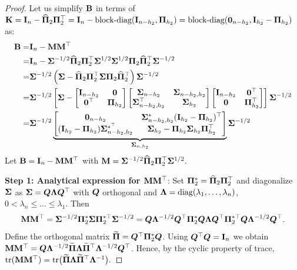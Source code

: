 \documentclass[numsec,webpdf,modern,medium,namedate]{oup-authoring-template}
\theoremstyle{thmstyleone}%
\theoremstyle{thmstyletwo}%
\theoremstyle{thmstylethree}%
\begin{document}
\begin{proof}
Let us simplify $\bB$ in terms of $\bK = \bI_n - \hatPi_2{\bPi}_2^\top = \bI_n - \text{block-diag}(\bI_{n-h_2},{\bPi}_{h_2}) = \text{block-diag}(\bzero_{n-h_2},\bI_{h_2}-{\bPi}_{h_2})$ as:
$$
\begin{aligned}
    \bB = & \bI_n - \bM\bM^\top\\
    = & \bI_n - {\bSig}^{-1/2} \hatPi_2{\bPi}_2^\top  {\bSig}^{1/2}{\bSig}^{1/2} {\bPi}_2\hatPi^\top_2{\bSig}^{-1/2}\\
    = & {\bSig}^{-1/2}\left({\bSig} - \hatPi_2 {\bPi}_2^\top {\bSig} {\bPi}_2\hatPi^\top_2\right){\bSig}^{-1/2}\\
    = & {\bSig}^{-1/2}\left[{\bSig} - \begin{bmatrix}
        \bI_{n-h_2} & \bzero\\
        \bzero^\top & {\bPi}_{h_2}
    \end{bmatrix}\begin{bmatrix}
        {\bSig}_{n-h_2} & {\bSig}_{n-h_2,h_2}\\
        {\bSig}_{n-h_2,h_2}^{\top} & {\bSig}_{h_2}
    \end{bmatrix} \begin{bmatrix}
        \bI_{n-h_2} & \bzero^\top\\
        \bzero & {\bPi}^\top_{h_2}
    \end{bmatrix}\right]{\bSig}^{-1/2} \\
    = & {\bSig}^{-1/2}\underbrace{\begin{bmatrix}
        \bzero_{n-h_2} & {\bSig}_{n-h_2,h_2}^{*}(\bI_{h_2} - {\bPi}_{h_2})^{\top}\\
        (\bI_{h_2} - {\bPi}_{h_2}){\bSig}_{n-h_2,h_2}^{*^\top} & {\bSig}_{h_2} - {\bPi}_{h_2}{\bSig}_{h_2}{\bPi}_{h_2}^\top
    \end{bmatrix}}_{{\bSig}_{n,h_2}}{\bSig}^{-1/2}
\end{aligned}
$$
Let $\bB = \bI_n - \bM\bM^\top$ with $\bM = {\bSig}^{-1/2}\hatPi_2{\bPi}_2^\top{\bSig}^{1/2}.$

\textbf{Step 1: Analytical expression for $\bM\bM^\top$}: Set ${\bPi}_2^{\ast} = \hatPi_2{\bPi}_2^\top$ and diagonalize ${\bSig}$ as ${\bSig} = \bQ\bLam \bQ^\top$ with $\bQ$ orthogonal and $\bLam = \operatorname{diag}(\lambda_1,\dots,\lambda_n)$, $0<\lambda_n\le \dots \le \lambda_1$. Then
\begin{equation}
\bM\bM^\top = {\bSig}^{-1/2}{\bPi}_2^{\ast}{\bSig} {\bPi}_2^{\ast\top}{\bSig}^{-1/2}
= \bQ\bLam^{-1/2}\bQ^\top {\bPi}_2^{\ast} \bQ\bLam \bQ^\top {\bPi}_2^{\ast\top} \bQ \bLam^{-1/2}\bQ^\top.
\end{equation}
Define the orthogonal matrix $\widetilde{{\bPi}}=\bQ^\top{\bPi}_2^{\ast} \bQ$. Using $\bQ^\top \bQ=\bI_n$ we obtain $\bM\bM^\top = \bQ\bLam^{-1/2}\widetilde{{\bPi}}\bLam
\widetilde{{\bPi}}^\top \bLam^{-1/2}\bQ^\top$. Hence, by the cyclic property of trace, $\tr(\bM\bM^\top)=\tr\bigl(\widetilde{{\bPi}}\bLam \widetilde{{\bPi}}^\top \bLam^{-1}\bigr).$


\end{proof}
\end{document}
